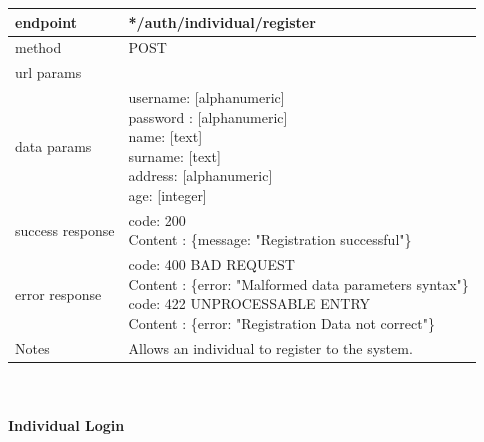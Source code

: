 \begin{legal}
\begin{legal}
\begin{itemize}
							\begin{tabularx}{\linewidth}{| l| l }
								\hline
								endpoint & */auth/individual/register \\
								\hline
								method & POST \\
								\hline
								url params & \\
								\hline
								data params &
								\parbox{0.7\textwidth}{
									\bigskip
									username: [alphanumeric]\\
									password : [alphanumeric]\\
									name: [text]\\
									surname: [text]\\
									address: [alphanumeric]\\
									age: [integer]
									\bigskip
								} \\
								\hline
								success response &
								\parbox{0.7\textwidth}{
									\bigskip
									code: 200\\
									Content : \{message: "Registration successful"\}
									\bigskip
								} \\
								\hline
								error response &
								\parbox{0.7\textwidth}{
									\bigskip
									code: 400 BAD REQUEST \\
									Content : \{error: "Malformed data parameters syntax"\}\\
									code: 422 UNPROCESSABLE ENTRY \\
									Content : \{error: "Registration Data not correct"\}
									\bigskip
								} \\
								\hline
								Notes & 
								\parbox{0.7\textwidth}{
									\bigskip Allows an individual to register to the system.
								\bigskip}  \\
								\hline
							\end{tabularx}\\\\
					
							\textbf{Individual Login}\\


\end{itemize}
\end{legal}
\end{legal}
